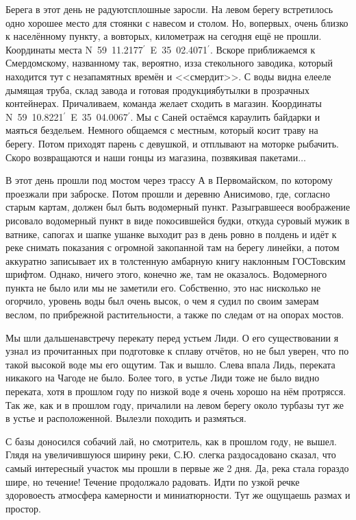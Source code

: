 Берега в этот день не радуют\mdash  сплошные заросли. На левом берегу встретилось одно хорошее место для стоянки с навесом и столом. Но, во\sdash первых, очень близко к населённому пункту, а во\sdash вторых, километраж на сегодня ещё не прошли. Координаты места N~59\degree~11.2177$^\prime$~E~35\degree~02.4071$^\prime$. Вскоре приближаемся к Смердомскому, названному так, вероятно, из\sdash за стекольного заводика, который находится тут с незапамятных времён и <<смердит>>. С воды видна еле\sdash еле дымящая труба, склад завода и готовая продукция\mdash  бутылки в прозрачных контейнерах. Причаливаем, команда желает сходить в магазин. Координаты N~59\degree~10.8221$^\prime$~E~35\degree~04.0067$^\prime$. Мы с Саней остаёмся караулить байдарки и маяться бездельем. Немного общаемся с местным, который косит траву на берегу. Потом приходят парень с девушкой, и отплывают на моторке рыбачить. Скоро возвращаются и наши гонцы из магазина, позвякивая пакетами$\ldots$ 

В этот день прошли под мостом через трассу А в Первомайском, по которому проезжали при заброске. Потом прошли и деревню Анисимово, где, согласно старым картам, должен был быть водомерный пункт. Разыгравшееся воображение рисовало водомерный пункт в виде покосившейся будки, откуда суровый мужик в ватнике, сапогах и шапке ушанке выходит раз в день ровно в полдень и идёт к реке снимать показания с огромной закопанной там на берегу линейки, а потом аккуратно записывает их в толстенную амбарную книгу наклонным ГОСТ\sdash овским шрифтом. Однако, ничего этого, конечно же, там не оказалось. Водомерного пункта не было или мы не заметили его. Собственно, это нас нисколько не огорчило, уровень воды был очень высок, о чем я судил по своим замерам веслом, по прибрежной растительности, а также по следам от на опорах мостов. 

Мы шли дальше\mdash  навстречу перекату перед устьем Лиди. О его существовании я узнал из прочитанных при подготовке к сплаву отчётов, но не был уверен, что по такой высокой воде мы его ощутим. Так и вышло. Слева впала Лидь, переката никакого на Чагоде не было. Более того, в устье Лиди тоже не было видно переката, хотя в прошлом году по низкой воде я очень хорошо на нём протрясся. Так же, как и в прошлом году, причалили на левом берегу около турбазы тут же в устье и расположенной. Вылезли походить и размяться. 

С базы доносился собачий лай, но смотритель, как в прошлом году, не вышел. Глядя на увеличившуюся ширину реки, С.Ю. слегка раздосадовано сказал, что самый интересный участок мы прошли в первые же 2 дня. Да, река стала гораздо шире, но течение! Течение продолжало радовать. Идти по узкой речке здорово\mdash  есть атмосфера камерности и миниатюрности. Тут же ощущаешь размах и простор.

